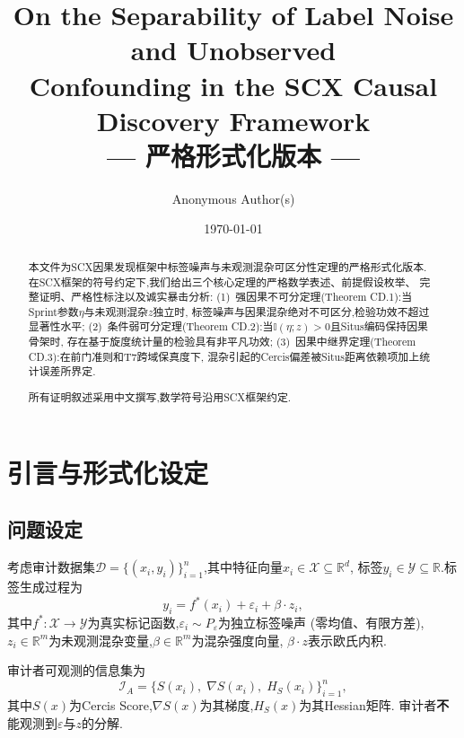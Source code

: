 \documentclass[12pt,a4paper]{article}
\title{\bfseries On the Separability of Label Noise and Unobserved\\
Confounding in the SCX Causal Discovery Framework\\
\large --- 严格形式化版本 ---}
\author{Anonymous Author(s)}
\date{\today}
\newcommand{\R}{\mathbb{R}}
\newcommand{\I}{\mathbb{I}}
\newcommand{\cX}{\mathcal{X}}
\newcommand{\cY}{\mathcal{Y}}
\newcommand{\cD}{\mathcal{D}}
\newcommand{\cI}{\mathcal{I}}
\begin{document}
\maketitle

\begin{abstract}
本文件为SCX因果发现框架中标签噪声与未观测混杂可区分性定理的严格形式化版本.
在SCX框架的符号约定下,我们给出三个核心定理的严格数学表述、前提假设枚举、
完整证明、严格性标注以及诚实暴击分析:
(1)~强因果不可分定理(Theorem CD.1):当Sprint参数$\eta$与未观测混杂$z$独立时,
标签噪声与因果混杂绝对不可区分,检验功效不超过显著性水平;
(2)~条件弱可分定理(Theorem CD.2):当$\I(\eta;z)>0$且Situs编码保持因果骨架时,
存在基于旋度统计量的检验具有非平凡功效;
(3)~因果中继界定理(Theorem CD.3):在前门准则和T7跨域保真度下,
混杂引起的Cercis偏差被Situs距离依赖项加上统计误差所界定.
\par
所有证明叙述采用中文撰写,数学符号沿用SCX框架约定.
\end{abstract}

\section{引言与形式化设定}
\label{sec:intro}

\subsection{问题设定}

考虑审计数据集$\cD = \{(x_i, y_i)\}_{i=1}^n$,其中特征向量$x_i \in \cX \subseteq \R^d$,
标签$y_i \in \cY \subseteq \R$.标签生成过程为
\begin{equation}\label{eq:label-process}
    y_i = f^*(x_i) + \varepsilon_i + \beta \cdot z_i,
\end{equation}
其中$f^*: \cX \to \cY$为真实标记函数,$\varepsilon_i \sim P_\varepsilon$为独立标签噪声
(零均值、有限方差),$z_i \in \R^m$为未观测混杂变量,$\beta \in \R^m$为混杂强度向量,
$\beta\cdot z$表示欧氏内积.

审计者可观测的信息集为
\begin{equation}\label{eq:info-set}
    \cI_A = \{S(x_i),\; \nabla S(x_i),\; H_S(x_i)\}_{i=1}^n,
\end{equation}
其中$S(x)$为Cercis Score,$\nabla S(x)$为其梯度,$H_S(x)$为其Hessian矩阵.
审计者\textbf{不}能观测到$\varepsilon$与$z$的分解.
\end{document}
